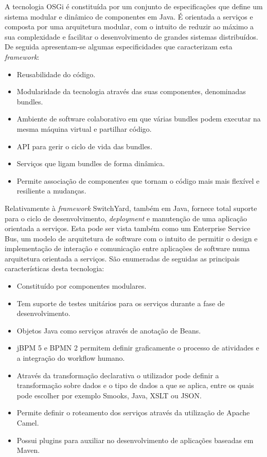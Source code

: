 A tecnologia OSGi é constituída por um conjunto de especificações que define um sistema modular e dinâmico de componentes em Java. É orientada a serviços e composta por uma arquitetura modular, com o intuito de reduzir ao máximo a sua complexidade e facilitar o desenvolvimento de grandes sistemas distribuídos. De seguida apresentam-se algumas especificidades que caracterizam esta \textit{framework}:
\begin{itemize}
	\item Reusabilidade do código.
	\item Modularidade da tecnologia através das suas componentes, denominadas bundles.
	\item Ambiente de software colaborativo em que várias bundles podem executar na mesma máquina virtual e partilhar código.
	\item API para gerir o ciclo de vida das bundles.
	\item Serviços que ligam bundles de forma dinâmica.
	\item Permite associação de componentes que tornam o código mais mais flexível e resiliente a mudanças.
\end{itemize}

Relativamente à \textit{framework} SwitchYard, também em Java, fornece total suporte para o ciclo de desenvolvimento, \textit{deployment} e manutenção de uma aplicação orientada a serviços. Esta pode ser vista também como um Enterprise Service Bus, um modelo de arquitetura de software com o intuito de permitir o design e implementação de interação e comunicação entre aplicações de software numa arquitetura orientada a serviços. São enumeradas de seguidas as principais características desta tecnologia:
\begin{itemize}
	\item Constituído por componentes modulares.
	\item Tem suporte de testes unitários para os serviços durante a fase de desenvolvimento.
	\item Objetos Java como serviços através de anotação de Beans.
	\item jBPM 5 e BPMN 2 permitem definir graficamente o processo de atividades e a integração do workflow humano.
	\item Através da transformação declarativa o utilizador pode definir a transformação sobre dados e o tipo de dados a que se aplica, entre os quais pode escolher por exemplo Smooks, Java, XSLT ou JSON.
	\item Permite definir o roteamento dos serviços através da utilização de Apache Camel.
	\item Possui plugins para auxiliar no desenvolvimento de aplicações baseadas em Maven. 
\end{itemize}


